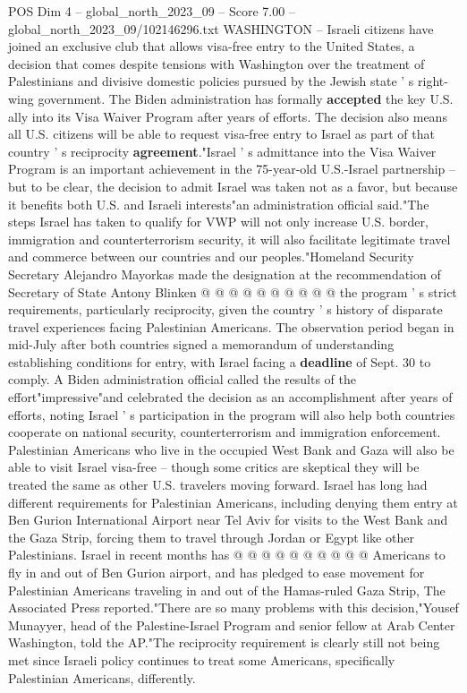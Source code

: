 \begin{textsample}{POS Dim 4 – global\_north\_2023\_09 – Score 7.00 – global\_north\_2023\_09/102146296.txt}  \label{ex:f4_pos_414}
WASHINGTON -- Israeli citizens have joined an exclusive club that allows visa-free entry to the United States, a decision that comes despite tensions with Washington over the treatment of Palestinians and divisive domestic policies pursued by the Jewish state ' s right-wing government.
The Biden administration has formally \textbf{accepted} the key U.S. ally into its Visa Waiver Program after years of efforts.
The decision also means all U.S. citizens will be able to request visa-free entry to Israel as part of that country ' s reciprocity \textbf{agreement}."Israel ' s admittance into the Visa Waiver Program is an important achievement in the 75-year-old U.S.-Israel partnership -- but to be clear, the decision to admit Israel was taken not as a favor, but because it benefits both U.S. and Israeli interests"an administration official said."The steps Israel has taken to qualify for VWP will not only increase U.S. border, immigration and counterterrorism security, it will also facilitate legitimate travel and commerce between our countries and our peoples."Homeland Security Secretary Alejandro Mayorkas made the designation at the recommendation of Secretary of State Antony Blinken @ @ @ @ @ @ @ @ @ @ the program ' s strict requirements, particularly reciprocity, given the country ' s history of disparate travel experiences facing Palestinian Americans.
The observation period began in mid-July after both countries signed a memorandum of understanding establishing conditions for entry, with Israel facing a \textbf{deadline} of Sept. 30 to comply.
A Biden administration official called the results of the effort"impressive"and celebrated the decision as an accomplishment after years of efforts, noting Israel ' s participation in the program will also help both countries cooperate on national security, counterterrorism and immigration enforcement.
Palestinian Americans who live in the occupied West Bank and Gaza will also be able to visit Israel visa-free -- though some critics are skeptical they will be treated the same as other U.S. travelers moving forward.
Israel has long had different requirements for Palestinian Americans, including denying them entry at Ben Gurion International Airport near Tel Aviv for visits to the West Bank and the Gaza Strip, forcing them to travel through Jordan or Egypt like other Palestinians.
Israel in recent months has @ @ @ @ @ @ @ @ @ @ Americans to fly in and out of Ben Gurion airport, and has pledged to ease movement for Palestinian Americans traveling in and out of the Hamas-ruled Gaza Strip, The Associated Press reported."There are so many problems with this decision,"Yousef Munayyer, head of the Palestine-Israel Program and senior fellow at Arab Center Washington, told the AP."The reciprocity requirement is clearly still not being met since Israeli policy continues to treat some Americans, specifically Palestinian Americans, differently.

\end{textsample}
